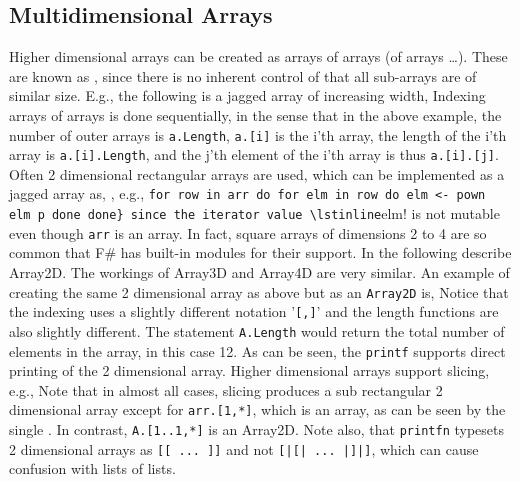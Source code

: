 \subsection{Multidimensional Arrays}
Higher dimensional arrays can be created as arrays of arrays (of arrays \dots). These are known as , since there is no inherent control of that all sub-arrays are of similar size. E.g., the following is a jagged array of increasing width,
%
%
Indexing arrays of arrays is done sequentially, in the sense that in the above example, the number of outer arrays is \lstinline|a.Length|,  \lstinline|a.[i]| is the i'th array, the length of the i'th array is \lstinline|a.[i].Length|, and the j'th element of the i'th array is thus \lstinline|a.[i].[j]|. Often 2 dimensional rectangular arrays are used, which can be implemented as a jagged array as,
%
, e.g., \lstinline!for row in arr do for elm in row do elm <- pown elm p done done} since the iterator value \lstinline!elm! is not mutable even though \lstinline!arr! is an array.
%
In fact, square arrays of dimensions 2 to 4 are so common that F\# has built-in modules for their support. In the following describe Array2D. The workings of Array3D and Array4D are very similar. An example of creating the same 2 dimensional array as above but as an \texttt{Array2D} is,
%
%
Notice that the indexing uses a slightly different notation '\verb|[,]|' and the length functions are also slightly different. The statement \verb|A.Length| would return the total number of elements in the array, in this case 12. As can be seen, the \lstinline!printf! supports direct printing of the 2 dimensional array. Higher dimensional arrays support slicing, e.g.,
%
%
Note that in almost all cases, slicing produces a sub rectangular 2 dimensional array except for \lstinline{arr.[1,*]}, which is an array, as can be seen by the single \lexeme{[}. In contrast, \lstinline{A.[1..1,*]} is an Array2D. Note also, that \lstinline!printfn! typesets 2 dimensional arrays as \lstinline{[[ ... ]]} and not \lstinline{[|[| ... |]|]}, which can cause confusion with lists of lists.

